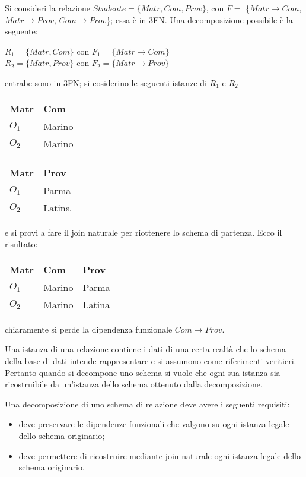  \begin{exmp}
  Si consideri la relazione $Studente = \{Matr, Com, Prov\}$, con $F = $ \{$Matr\rightarrow Com$,
  $Matr\rightarrow Prov$, $Com\rightarrow Prov$\}; essa è in 3FN. Una decomposizione possibile è
  la seguente:
  \begin{center}
    $R_1 = \{Matr, Com\}$ con $F_1 = \{Matr\rightarrow Com\}$ \\
    $R_2 = \{Matr, Prov\}$ con $F_2 = \{Matr\rightarrow Prov\}$ \\
   \end{center}
  entrabe sono in 3FN; si cosiderino le seguenti istanze di $R_1$ e $R_2$
  \begin{multicols}{2}
  \begin{flushright} 
  \begin{tabular}{l | l }
  Matr & Com\\
  \hline
  $O_1$ & Marino\\
  $O_2$ & Marino
 \end{tabular}
 \end{flushright}
  
  \begin{flushleft}
   \begin{tabular}{ l | l}
  Matr & Prov \\
  \hline
  $O_1$ & Parma\\
  $O_2$ & Latina
 \end{tabular}
\end{flushleft}
\end{multicols}
e si provi a fare il join naturale per riottenere lo schema di partenza. Ecco il
risultato:
  \begin{center} 
  \begin{tabular}{l | l | l}
  Matr & Com & Prov\\
  \hline
  $O_1$ & Marino & Parma\\
  $O_2$ & Marino & Latina
 \end{tabular}
 \end{center}
 
 chiaramente si perde la dipendenza funzionale $Com\rightarrow Prov$.
\end{exmp}
Una istanza di una relazione contiene i dati di una certa realtà che lo schema della 
base di dati intende rappresentare e si assumono come riferimenti veritieri. Pertanto 
quando si decompone uno schema si vuole che ogni sua istanza sia ricostruibile da 
un’istanza dello schema ottenuto dalla decomposizione.
\begin{prop}
Una decomposizione di uno schema di relazione deve avere i seguenti requisiti:
\begin{itemize}
 \item deve preservare le dipendenze funzionali che valgono su ogni istanza legale dello 
 schema originario;
 \item deve permettere di ricostruire mediante join naturale ogni istanza legale 
 dello schema originario.
\end{itemize} 
\end{prop}






